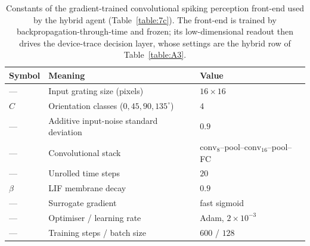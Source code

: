 \begin{table}[htbp!]
    \caption[Hybrid perception front-end constants.]{Constants of the gradient-trained
    convolutional spiking perception front-end used by the hybrid agent
    (Table~\ref{table:7c}). The front-end is trained by backpropagation-through-time and
    frozen; its low-dimensional readout then drives the device-trace decision layer,
    whose settings are the hybrid row of Table~\ref{table:A3}.}
    \begin{center}
    \small
    \begin{tabularx}{\textwidth}{@{}l X l@{}}
    \toprule
    Symbol & Meaning & Value \\
    \midrule
    ---            & Input grating size (pixels)                    & $16\times16$ \\
    $C$            & Orientation classes ($0,45,90,135^{\circ}$)    & $4$ \\
    ---            & Additive input-noise standard deviation        & $0.9$ \\
    ---            & Convolutional stack                            & $\text{conv}_8$--pool--$\text{conv}_{16}$--pool--FC \\
    ---            & Unrolled time steps                            & $20$ \\
    $\beta$        & LIF membrane decay                             & $0.9$ \\
    ---            & Surrogate gradient                             & fast sigmoid \\
    ---            & Optimiser / learning rate                      & Adam, $2\times10^{-3}$ \\
    ---            & Training steps / batch size                    & $600$ / $128$ \\
    \bottomrule
    \end{tabularx}
    \label{table:A5}
    \end{center}
    \vspace*{-\baselineskip}
\end{table}

